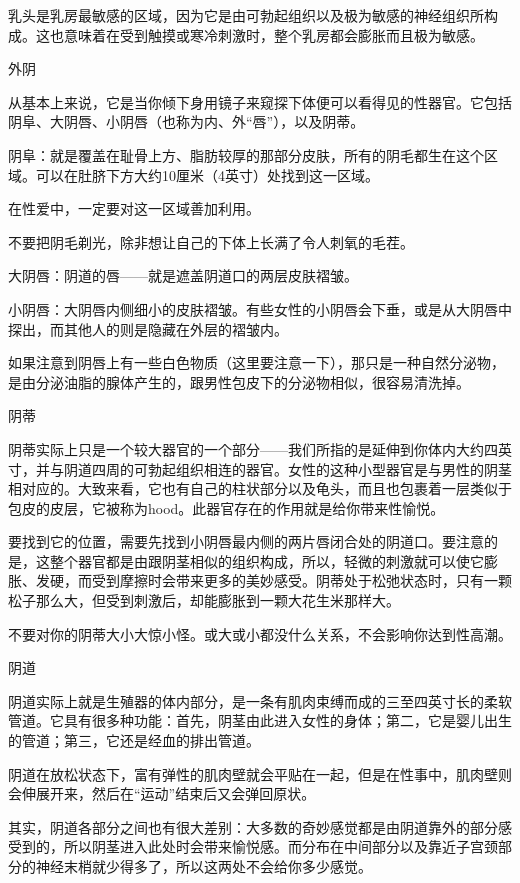 \documentclass[12pt,UTF8]{ctexbook}
\begin{document}
乳头是乳房最敏感的区域，因为它是由可勃起组织以及极为敏感的神经组织所构成。这也意味着在受到触摸或寒冷刺激时，整个乳房都会膨胀而且极为敏感。

外阴

从基本上来说，它是当你倾下身用镜子来窥探下体便可以看得见的性器官。它包括阴阜、大阴唇、小阴唇（也称为内、外“唇”），以及阴蒂。

阴阜：就是覆盖在耻骨上方、脂肪较厚的那部分皮肤，所有的阴毛都生在这个区域。可以在肚脐下方大约10厘米（4英寸）处找到这一区域。

在性爱中，一定要对这一区域善加利用。

不要把阴毛剃光，除非想让自己的下体上长满了令人刺氧的毛茬。

大阴唇：阴道的唇——就是遮盖阴道口的两层皮肤褶皱。

小阴唇：大阴唇内侧细小的皮肤褶皱。有些女性的小阴唇会下垂，或是从大阴唇中探出，而其他人的则是隐藏在外层的褶皱内。

如果注意到阴唇上有一些白色物质（这里要注意一下），那只是一种自然分泌物，是由分泌油脂的腺体产生的，跟男性包皮下的分泌物相似，很容易清洗掉。

阴蒂

阴蒂实际上只是一个较大器官的一个部分——我们所指的是延伸到你体内大约四英寸，并与阴道四周的可勃起组织相连的器官。女性的这种小型器官是与男性的阴茎相对应的。大致来看，它也有自己的柱状部分以及龟头，而且也包裹着一层类似于包皮的皮层，它被称为hood。此器官存在的作用就是给你带来性愉悦。

要找到它的位置，需要先找到小阴唇最内侧的两片唇闭合处的阴道口。要注意的是，这整个器官都是由跟阴茎相似的组织构成，所以，轻微的刺激就可以使它膨胀、发硬，而受到摩擦时会带来更多的美妙感受。阴蒂处于松弛状态时，只有一颗松子那么大，但受到刺激后，却能膨胀到一颗大花生米那样大。

不要对你的阴蒂大小大惊小怪。或大或小都没什么关系，不会影响你达到性高潮。

阴道

阴道实际上就是生殖器的体内部分，是一条有肌肉束缚而成的三至四英寸长的柔软管道。它具有很多种功能：首先，阴茎由此进入女性的身体；第二，它是婴儿出生的管道；第三，它还是经血的排出管道。

阴道在放松状态下，富有弹性的肌肉壁就会平贴在一起，但是在性事中，肌肉壁则会伸展开来，然后在“运动”结束后又会弹回原状。

其实，阴道各部分之间也有很大差别：大多数的奇妙感觉都是由阴道靠外的部分感受到的，所以阴茎进入此处时会带来愉悦感。而分布在中间部分以及靠近子宫颈部分的神经末梢就少得多了，所以这两处不会给你多少感觉。
\end{document}
